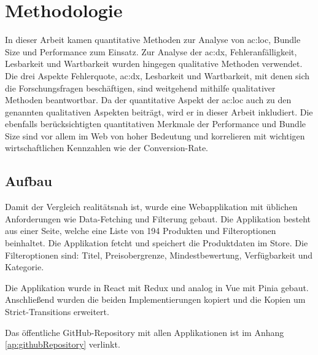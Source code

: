 \chapter{Methodologie}


In dieser Arbeit kamen quantitative Methoden zur Analyse von \acrshort{ac:loc}, Bundle Size und Performance zum Einsatz. Zur Analyse der \acrlong{ac:dx}, Fehleranfälligkeit, Lesbarkeit und Wartbarkeit wurden hingegen qualitative Methoden verwendet. Die drei Aspekte Fehlerquote, \acrshort{ac:dx}, Lesbarkeit und Wartbarkeit, mit denen sich die Forschungsfragen beschäftigen, sind weitgehend mithilfe qualitativer Methoden beantwortbar. Da der quantitative Aspekt der \acrshort{ac:loc} auch zu den genannten qualitativen Aspekten beiträgt, wird er in dieser Arbeit inkludiert. Die ebenfalls berücksichtigten quantitativen Merkmale der Performance und Bundle Size sind vor allem im Web von hoher Bedeutung und korrelieren mit wichtigen wirtschaftlichen Kennzahlen wie der Conversion-Rate.\cite{googleConversionRateSpeed}

\section{Aufbau}

Damit der Vergleich realitätsnah ist, wurde eine Webapplikation mit üblichen Anforderungen wie Data-Fetching und Filterung gebaut. Die Applikation besteht aus einer Seite, welche eine Liste von 194 Produkten und Filteroptionen beinhaltet. Die Applikation fetcht und speichert die Produktdaten im Store. Die Filteroptionen sind: Titel, Preisobergrenze, Mindestbewertung, Verfügbarkeit und Kategorie.

Die Applikation wurde in React mit Redux und analog in Vue mit Pinia gebaut. Anschließend wurden die beiden Implementierungen kopiert und die Kopien um Strict-Transitions erweitert.

Das öffentliche GitHub-Repository mit allen Applikationen ist im Anhang \ref{ap:githubRepository} verlinkt.

